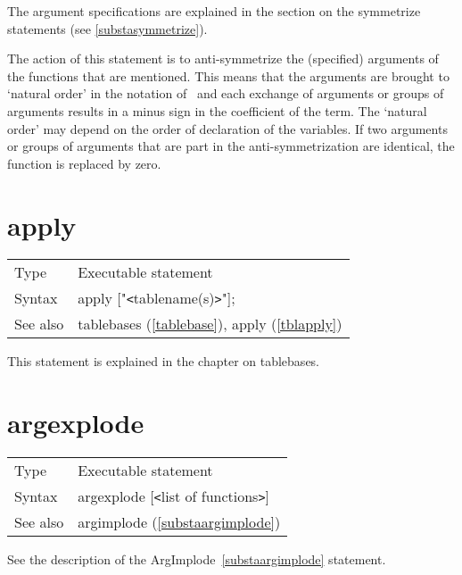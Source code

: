 \noindent The argument specifications are explained in the section on the 
symmetrize statements (see \ref{substasymmetrize}).\medskip

\noindent The action of this statement is to 
anti-symmetrize the (specified) arguments of the functions that are 
mentioned. This means that the arguments are brought to `natural order' in 
the notation of \FORM\ and each exchange of arguments or groups of arguments 
results in a minus sign in the coefficient of the term. The `natural order' 
may depend on the order of declaration of the variables. If two arguments 
or groups of arguments that are part in the anti-symmetrization are 
identical, the function is replaced by zero. \vspace{10mm}


\section{apply}
\label{substaapply}

\noindent \begin{tabular}{ll}
Type & Executable statement\\
Syntax & apply ["{\tt<}tablename(s){\tt>}"];
\\ See also & tablebases (\ref{tablebase}), apply (\ref{tblapply})
\end{tabular} \vspace{4mm}

\noindent This statement is explained in the chapter on 
tablebases.\vspace{10mm}


\section{argexplode}
\label{substaargexplode}

\noindent \begin{tabular}{ll}
Type & Executable statement\\
Syntax & argexplode [{\tt<}list of functions{\tt>}] \\
See also & argimplode (\ref{substaargimplode})
\end{tabular} \vspace{4mm}

\noindent See the description of the ArgImplode~\ref{substaargimplode} 
statement.
\vspace{10mm}

